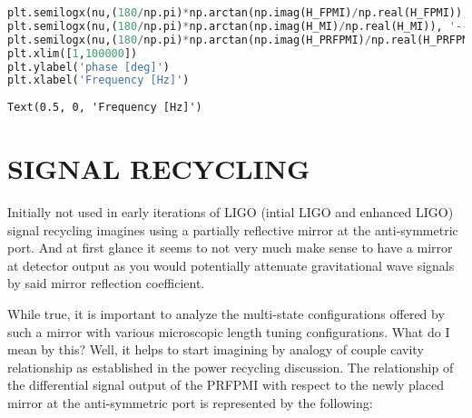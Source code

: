 \begin{lstlisting}[frame=single, language=Python]
plt.semilogx(nu,(180/np.pi)*np.arctan(np.imag(H_FPMI)/np.real(H_FPMI)),'--', linewidth=line_width)
plt.semilogx(nu,(180/np.pi)*np.arctan(np.imag(H_MI)/np.real(H_MI)), '--', linewidth=line_width)
plt.semilogx(nu,(180/np.pi)*np.arctan(np.imag(H_PRFPMI)/np.real(H_PRFPMI)),linestyle='--', linewidth=line_width,dashes=(3,10))
plt.xlim([1,100000])
plt.ylabel('phase [deg]')
plt.xlabel('Frequency [Hz]')
\end{lstlisting}

\begin{lstlisting}
Text(0.5, 0, 'Frequency [Hz]')
\end{lstlisting}

\hypertarget{signal-recyclinginitially-not-used-in-early-iterations-of-ligo-intial-ligo-and-enhanced-ligo-signal-recycling-imagines-using-a-partially-reflective-mirror-at-the-anti-symmetric-port.-and-at-first-glance-it-seems-to-not-very-much-make-sense-to-have-a-mirror-at-detector-output-as-you-would-potentially-attenuate-gravitational-wave-signals-by-said-mirror-reflection-coefficient.}{%
\section{SIGNAL RECYCLING}
Initially not used in early iterations of LIGO
(intial LIGO and enhanced LIGO) signal recycling imagines using a
partially reflective mirror at the anti-symmetric port. And at first
glance it seems to not very much make sense to have a mirror at detector
output as you would potentially attenuate gravitational wave signals by
said mirror reflection
coefficient.}\label{signal-recyclinginitially-not-used-in-early-iterations-of-ligo-intial-ligo-and-enhanced-ligo-signal-recycling-imagines-using-a-partially-reflective-mirror-at-the-anti-symmetric-port.-and-at-first-glance-it-seems-to-not-very-much-make-sense-to-have-a-mirror-at-detector-output-as-you-would-potentially-attenuate-gravitational-wave-signals-by-said-mirror-reflection-coefficient.}

While true, it is important to analyze the multi-state configurations
offered by such a mirror with various microscopic length tuning
configurations. What do I mean by this? Well, it helps to start
imagining by analogy of couple cavity relationship as established in the
power recycling discussion. The relationship of the differential signal
output of the PRFPMI with respect to the newly placed mirror at the
anti-symmetric port is represented by the following:

